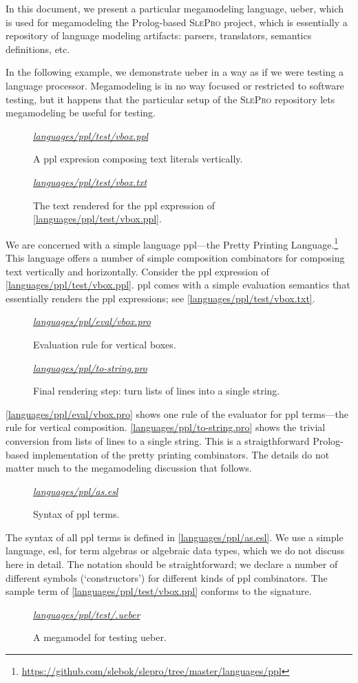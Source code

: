 \documentclass[preprint,authoryear,12pt]{noelsarticle}
\newcommand{\slepro}{\textsc{SlePro}}
\newcommand{\codefigure}[3]{
\begin{figure}[t!]
\begin{boxedminipage}{\hsize}
\mbox{}\hfill{}{\small\textit{\href{http://github.com/slebok/slepro/tree/master/#2}{#2}}}

\end{boxedminipage}
\caption{#1.}
\label{#2}
\medskip
\end{figure}}
\newcommand{\ueber}{\textsf{ueber}}
\newcommand{\ppl}{\textsf{ppl}}
\newcommand{\esl}{\textsf{esl}}
\begin{document}
In this document, we present a particular megamodeling language,
\ueber, which is used for megamodeling the Prolog-based \slepro{}
project, which is essentially a repository of language modeling
artifacts: parsers, translators, semantics definitions, etc.

In the following example, we demonstrate \ueber{} in a way as if we
were testing a language processor. Megamodeling is in no way focused
or restricted to software testing, but it happens that the particular
setup of the \slepro{} repository lets megamodeling be useful for
testing.

\codefigure{%
A \ppl{} expresion composing text literals vertically}{%
languages/ppl/test/vbox.ppl}{%
prolog}

\codefigure{%
The text rendered for the \ppl{} expression of \autoref{languages/ppl/test/vbox.ppl}}{%
languages/ppl/test/vbox.txt}{%
text}

We are concerned with a simple language \ppl---the Pretty Printing
Language.\footnote{\url{https://github.com/slebok/slepro/tree/master/languages/ppl}}
This language offers a number of simple composition combinators for
composing text vertically and horizontally. Consider the \ppl{}
expression of \autoref{languages/ppl/test/vbox.ppl}. \ppl{} comes with
a simple evaluation semantics that essentially renders the \ppl{}
expressions; see \autoref{languages/ppl/test/vbox.txt}.

\codefigure{%
Evaluation rule for vertical boxes}{%
languages/ppl/eval/vbox.pro}{%
prolog}

\codefigure{%
Final rendering step: turn lists of lines into a single string}{%
languages/ppl/to-string.pro}{%
prolog}

\autoref{languages/ppl/eval/vbox.pro} shows one rule of the evaluator
for \ppl{} terms---the rule for vertical
composition. \autoref{languages/ppl/to-string.pro} shows the trivial
conversion from lists of lines to a single string. This is a
straigthforward Prolog-based implementation of the pretty printing
combinators. The details do not matter much to the megamodeling
discussion that follows.

\codefigure{%
Syntax of \ppl{} terms}{%
languages/ppl/as.esl}{%
esl}

The syntax of all \ppl{} terms is defined in
\autoref{languages/ppl/as.esl}. We use a simple language, \esl, for
term algebras or algebraic data types, which we do not discuss here in
detail. The notation should be straightforward; we declare a number of
different symbols (`constructors') for different kinds of \ppl{}
combinators. The sample term of \autoref{languages/ppl/test/vbox.ppl}
conforms to the signature.

\codefigure{%
A megamodel for testing \ueber}{%
languages/ppl/test/.ueber}{%
ueber}



{\small


%


}

\end{document}
